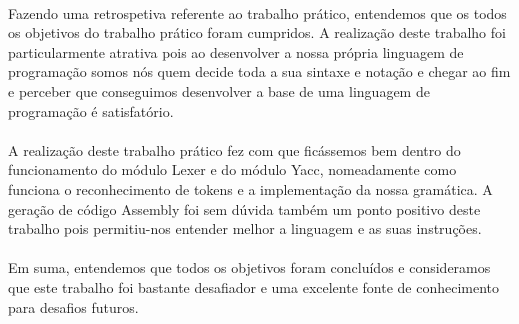 \documentclass[11pt,a4paper]{report}
\begin{document}
\paragraph{}
Fazendo uma retrospetiva referente ao trabalho prático, entendemos que os todos os objetivos do trabalho prático foram cumpridos. A realização deste trabalho foi particularmente atrativa pois ao desenvolver a nossa própria linguagem de programação somos nós quem decide toda a sua sintaxe e notação e chegar ao fim e perceber que conseguimos desenvolver a base de uma linguagem de programação é satisfatório.
\paragraph{}
A realização deste trabalho prático fez com que ficássemos bem dentro do funcionamento do módulo Lexer e do módulo Yacc, nomeadamente como funciona o reconhecimento de tokens e a implementação da nossa gramática. A geração de código Assembly foi sem dúvida também um ponto positivo deste trabalho pois permitiu-nos entender melhor a linguagem e as suas instruções. 
\paragraph{}
Em suma, entendemos que todos os objetivos foram concluídos e consideramos que este trabalho foi bastante desafiador e uma excelente fonte de conhecimento para desafios futuros. 
\end{document}
